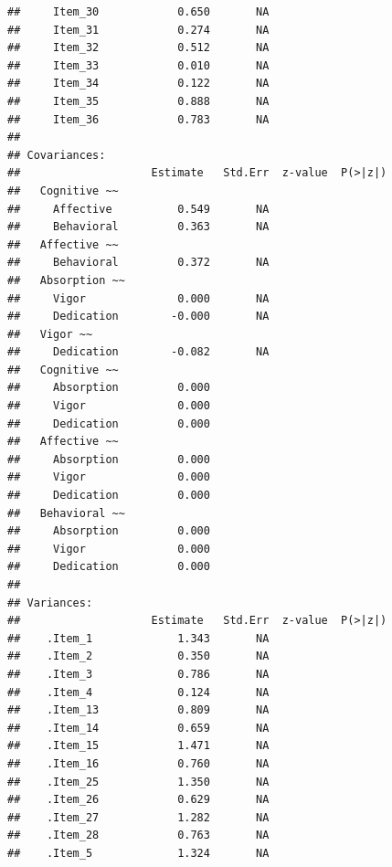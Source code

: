 \documentclass[
]{book}
\begin{document}
\begin{verbatim}
##     Item_30            0.650       NA                  
##     Item_31            0.274       NA                  
##     Item_32            0.512       NA                  
##     Item_33            0.010       NA                  
##     Item_34            0.122       NA                  
##     Item_35            0.888       NA                  
##     Item_36            0.783       NA                  
## 
## Covariances:
##                    Estimate   Std.Err  z-value  P(>|z|)
##   Cognitive ~~                                         
##     Affective          0.549       NA                  
##     Behavioral         0.363       NA                  
##   Affective ~~                                         
##     Behavioral         0.372       NA                  
##   Absorption ~~                                        
##     Vigor              0.000       NA                  
##     Dedication        -0.000       NA                  
##   Vigor ~~                                             
##     Dedication        -0.082       NA                  
##   Cognitive ~~                                         
##     Absorption         0.000                           
##     Vigor              0.000                           
##     Dedication         0.000                           
##   Affective ~~                                         
##     Absorption         0.000                           
##     Vigor              0.000                           
##     Dedication         0.000                           
##   Behavioral ~~                                        
##     Absorption         0.000                           
##     Vigor              0.000                           
##     Dedication         0.000                           
## 
## Variances:
##                    Estimate   Std.Err  z-value  P(>|z|)
##    .Item_1             1.343       NA                  
##    .Item_2             0.350       NA                  
##    .Item_3             0.786       NA                  
##    .Item_4             0.124       NA                  
##    .Item_13            0.809       NA                  
##    .Item_14            0.659       NA                  
##    .Item_15            1.471       NA                  
##    .Item_16            0.760       NA                  
##    .Item_25            1.350       NA                  
##    .Item_26            0.629       NA                  
##    .Item_27            1.282       NA                  
##    .Item_28            0.763       NA                  
##    .Item_5             1.324       NA                  

\end{verbatim}
\end{document}
